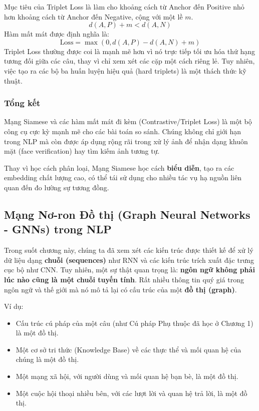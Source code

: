 Mục tiêu của Triplet Loss là làm cho khoảng cách từ Anchor đến Positive nhỏ hơn khoảng cách từ Anchor đến Negative, cộng với một lề $m$.
$$ d(A, P) + m < d(A, N) $$
Hàm mất mát được định nghĩa là:
\begin{equation}
    \text{Loss} = \max(0, d(A, P) - d(A, N) + m)
    \label{eq:triplet_loss}
\end{equation}
Triplet Loss thường được coi là mạnh mẽ hơn vì nó trực tiếp tối ưu hóa thứ hạng tương đối giữa các câu, thay vì chỉ xem xét các cặp một cách riêng lẻ. Tuy nhiên, việc tạo ra các bộ ba huấn luyện hiệu quả (hard triplets) là một thách thức kỹ thuật.

\subsubsection{Tổng kết}
Mạng Siamese và các hàm mất mát đi kèm (Contrastive/Triplet Loss) là một bộ công cụ cực kỳ mạnh mẽ cho các bài toán so sánh. Chúng không chỉ giới hạn trong NLP mà còn được áp dụng rộng rãi trong xử lý ảnh để nhận dạng khuôn mặt (face verification) hay tìm kiếm ảnh tương tự.

Thay vì học cách phân loại, Mạng Siamese học cách \textbf{biểu diễn}, tạo ra các embedding chất lượng cao, có thể tái sử dụng cho nhiều tác vụ hạ nguồn liên quan đến đo lường sự tương đồng.

\subsection{Mạng Nơ-ron Đồ thị (Graph Neural Networks - GNNs) trong NLP}
\label{ssec:gnn_for_nlp}

Trong suốt chương này, chúng ta đã xem xét các kiến trúc được thiết kế để xử lý dữ liệu dạng \textbf{chuỗi (sequences)} như RNN và các kiến trúc trích xuất đặc trưng cục bộ như CNN. Tuy nhiên, một sự thật quan trọng là: \textbf{ngôn ngữ không phải lúc nào cũng là một chuỗi tuyến tính}. Rất nhiều thông tin quý giá trong ngôn ngữ và thế giới mà nó mô tả lại có cấu trúc của một \textbf{đồ thị (graph)}.

Ví dụ:
\begin{itemize}
    \item Cấu trúc cú pháp của một câu (như Cú pháp Phụ thuộc đã học ở Chương 1) là một đồ thị.
    \item Một cơ sở tri thức (Knowledge Base) về các thực thể và mối quan hệ của chúng là một đồ thị.
    \item Một mạng xã hội, với người dùng và mối quan hệ bạn bè, là một đồ thị.
    \item Một cuộc hội thoại nhiều bên, với các lượt lời và quan hệ trả lời, là một đồ thị.
\end{itemize}

